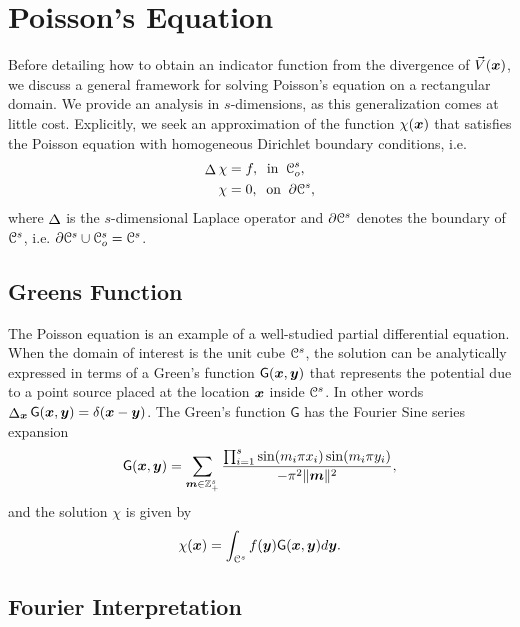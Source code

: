 \section{Poisson's Equation} 
Before detailing how to obtain an indicator function from the divergence of $\vec{V}(\boldsymbol{x})$, we discuss a general framework for solving Poisson's equation on a rectangular domain. We provide an analysis in $s$-dimensions, as this generalization comes at little cost. Explicitly, we seek an approximation of the function $\chi(\boldsymbol{x})$ that satisfies the Poisson equation with homogeneous Dirichlet boundary conditions, i.e. 
\begin{equation} \label{eq:PoissonEquation}
	\begin{split}
		\laplacian{\chi} &= f, \;\; \text{in} \;\; \oucube^s, \\
		\chi &= 0, \;\; \text{on} \;\; \partial \ucube^s,
	\end{split}
\end{equation}
where $\mathop{\Delta}$ is the $s$-dimensional Laplace operator and
$\partial \mathcal{C}^s$ denotes the boundary of $\mathcal{C}^s$,
i.e. $\partial \mathcal{C}^s \cup \mathcal{C}_o^s = \mathcal{C}^s$.

\subsection{Greens Function}
The Poisson equation is an example of a well-studied partial differential equation. When the domain of interest is the unit cube $\mathcal{C}^s$, the solution can be analytically expressed in terms of a Green's function $\mathsf{G}(\boldsymbol{x},\boldsymbol{y})$ that represents the potential due to a point source placed at the location $\boldsymbol{x}$ inside $\mathcal{C}^s$.  In other words $\mathop{\Delta}_{\boldsymbol{x}} \mathsf{G}(\boldsymbol{x},\boldsymbol{y}) = \delta(\boldsymbol{x}-\boldsymbol{y})$. The Green's function $\mathsf{G}$ has the Fourier Sine series expansion 
\begin{equation}
	\mathsf{G}(\vect{x},\vect{y}) = \sum_{\vect{m} \in \ints^s_+} 
	\frac{\prod_{i=1}^s \sin(m_i \pi x_i) \sin(m_i \pi y_i)}
	{-\pi^2 \norm{\vect{m}}^2},
	\label{eq:green}
\end{equation}
and the solution $\chi$ is given by
\begin{equation}
	\chi(\vect{x}) = \int_{\ucube^s}f(\vect{y})\mathsf{G}(\vect{x},\vect{y}) d\vect{y}.
	\label{eq:analytic}
\end{equation}


\subsection{Fourier Interpretation}

